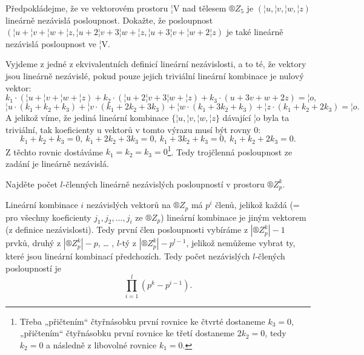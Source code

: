 \documentclass[12pt]{article}					%
\begin{document}
    \begin{priklad}[7.2]
        Předpokládejme, že ve vektorovém prostoru ¦V nad tělesem $®Z_5$ je $(¦u, ¦v, ¦w, ¦z)$ lineárně nezávislá posloupnost. Dokažte, že posloupnost $(¦u + ¦v + ¦w + ¦z, ¦u + 2¦v + 3¦w + ¦z, ¦u + 3¦v + ¦w + 2¦z)$ je také lineárně nezávislá posloupnost ve ¦V.

        \begin{dukazin}
            Vyjdeme z jedné z ekvivalentních definicí lineární nezávislosti, a to té, že vektory jsou lineárně nezávislé, pokud pouze jejich triviální lineární kombinace je nulový vektor:
            $$ k_1·(¦u + ¦v + ¦w + ¦z) + k_2·(¦u + 2¦v + 3¦w + ¦z) + k_3·(u + 3v + w + 2z) = ¦o, $$ 
            $$ ¦u·(k_1 + k_2 + k_3) + ¦v·(k_1 + 2k_2 + 3k_3) + ¦w·(k_1 + 3k_2 + k_3) + ¦z·(k_1 + k_2 + 2k_3) = ¦o. $$ 
            A jelikož víme, že jediná lineární kombinace $\{¦u, ¦v, ¦w, ¦z\}$ dávající ¦o byla ta triviální, tak koeficienty u vektorů v tomto výrazu musí být rovny 0:
            $$ k_1 + k_2 + k_3 = 0,\ k_1 + 2k_2 + 3k_3 = 0,\ k_1 + 3k_2 + k_3 = 0,\ k_1 + k_2 + 2k_3 = 0. $$
            Z těchto rovnic dostáváme $k_1 = k_2 = k_3 = 0$\footnote{Třeba „přičtením“ čtyřnásobku první rovnice ke čtvrté dostaneme $k_3 = 0$, „přičtením“ čtyřnásobku první rovnice ke třetí dostaneme $2k_2 = 0$, tedy $k_2 = 0$ a následně z libovolné rovnice $k_1 = 0$.}. Tedy trojčlenná posloupnost ze zadání je lineárně nezávislá.
        \end{dukazin}
    \end{priklad}

\pagebreak

    \begin{priklad}[7.bonus]
        Najděte počet $l$-členných lineárně nezávislých posloupností v prostoru $®Z^k_p$.
        \begin{reseni}
                Lineární kombinace $i$ nezávislých vektorů na $®Z_p$ má $p^i$ členů, jelikož každá (= pro všechny koeficienty $j_1, j_2, …, j_i$ ze $®Z_p$) lineární kombinace je jiným vektorem (z definice nezávislosti). Tedy první člen posloupnosti vybíráme z $\left|®Z^k_p\right| - 1$ prvků, druhý z $\left|®Z^k_p\right| - p$, … , $l$-tý z $\left|®Z^k_p\right| - p^{l-1}$, jelikož nemůžeme vybrat ty, které jsou lineární kombinací předchozích. Tedy počet nezávislých $l$-člených posloupností je
                $$ \prod_{i=1}^{l} (p^k - p^{i-1}). $$ 
        \end{reseni}
    \end{priklad}
\end{document}
